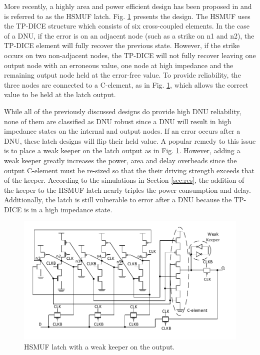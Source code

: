 More recently, a highly area and power efficient design has been proposed in \cite{HSMUF} and is referred to as the HSMUF latch. Fig. \ref{HSMUF_fig} presents the design. The HSMUF uses the TP-DICE \cite{TPDICE} structure which consists of six cross-coupled elements. In the case of a DNU, if the error is on an adjacent node (such as a strike on n1 and n2), the TP-DICE element will fully recover the previous state. However, if the strike occurs on two non-adjacent nodes, the TP-DICE will not fully recover leaving one output node with an erroneous value, one node at high impedance and the remaining output node held at the error-free value. To provide reliability, the three nodes are connected to a C-element, as in Fig. \ref{HSMUF_fig}, which allows the correct value to be held at the latch output. 

While all of the previously discussed designs do provide high DNU reliability, none of them are classified as DNU robust since a DNU will result in high impedance states on the internal and output nodes. If an error occurs after a DNU, these latch designs will flip their held value. A popular remedy to this issue is to place a weak keeper on the latch output as in Fig. \ref{HSMUF_fig}. However, adding a weak keeper greatly increases the power, area and delay overheads since the output C-element must be re-sized so that the their driving strength exceeds that of the keeper. According to the simulations in Section \ref{sec:res}, the addition of the keeper to the HSMUF latch nearly triples the power consumption and delay. Additionally, the latch is still vulnerable to error after a DNU because the TP-DICE is in a high impedance state.

\begin{figure}[!htbp]
	\centering
	\includegraphics[width=\linewidth]{Figures/HSMUF}
	\caption{HSMUF latch \cite{HSMUF} with a weak keeper on the output.}
	\label{HSMUF_fig}
\end{figure}

